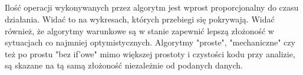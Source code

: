 \documentclass[11pt,a4paper]{article}
\begin{document}
\subsection*{}
Ilość operacji wykonywanych przez algorytm jest wprost proporcjonalny do czasu działania. Widać to na wykresach, których przebiegi się pokrywają. Widać również, że algorytmy warunkowe są w stanie zapewnić lepszą złożoność w sytuacjach co najmniej optymistycznych. Algorytmy "proste", "mechaniczne" czy też po prostu "bez if'owe" mimo większej prostoty i czystości kodu przy analizie, są skazane na tą samą złożoność niezależnie od podanych danych.
\end{document}
